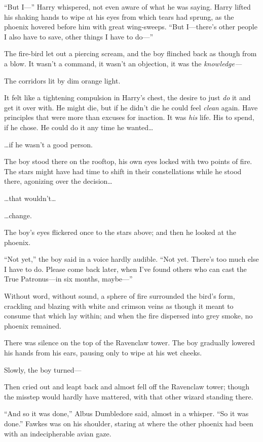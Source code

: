 “But I—” Harry whispered, not even aware of what he was saying. Harry lifted his shaking hands to wipe at his eyes from which tears had sprung, as the phoenix hovered before him with great wing-sweeps. “But I—there’s other people I also have to save, other things I have to do—”

The fire-bird let out a piercing scream, and the boy flinched back as though from a blow. It wasn’t a command, it wasn’t an objection, it was the \emph{knowledge—}

The corridors lit by dim orange light.

It felt like a tightening compulsion in Harry’s chest, the desire to just \emph{do} it and get it over with. He might die, but if he didn’t die he could feel \emph{clean} again. Have principles that were more than excuses for inaction. It was \emph{his} life. His to spend, if he chose. He could do it any time he wanted…

…if he wasn’t a good person.

\later

The boy stood there on the rooftop, his own eyes locked with two points of fire. The stars might have had time to shift in their constellations while he stood there, agonizing over the decision…

…that wouldn’t…

…change.

The boy’s eyes flickered once to the stars above; and then he looked at the phoenix.

“Not yet,” the boy said in a voice hardly audible. “Not yet. There’s too much else I have to do. Please come back later, when I’ve found others who can cast the True Patronus—in six months, maybe—”

Without word, without sound, a sphere of fire surrounded the bird’s form, crackling and blazing with white and crimson veins as though it meant to consume that which lay within; and when the fire dispersed into grey smoke, no phoenix remained.

There was silence on the top of the Ravenclaw tower. The boy gradually lowered his hands from his ears, pausing only to wipe at his wet cheeks.

Slowly, the boy turned—

Then cried out and leapt back and almost fell off the Ravenclaw tower; though the misstep would hardly have mattered, with that other wizard standing there.

“And so it was done,” Albus Dumbledore said, almost in a whisper. “So it was done.” Fawkes was on his shoulder, staring at where the other phoenix had been with an indecipherable avian gaze.

